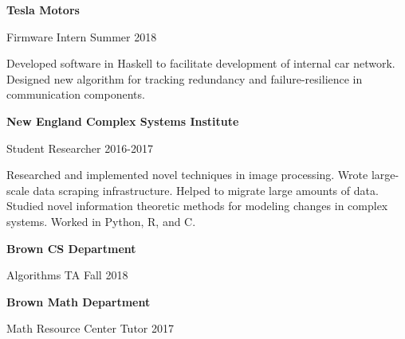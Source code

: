 \documentclass{article}
\renewcommand{\section}[1]{\vspace{1.5em}{\huge \textsc{#1}}\vspace{1em}}
\renewcommand{\subsection}[1]{{\large \textbf{#1}}\vspace{0.5em}}
\newcommand{\descdate}[2]{#1 \hfill #2\vspace{0.5em}}
\newenvironment{row}{\vspace{0.75em}\begin{minipage}[t]{\textwidth}}{\end{minipage}\vspace{0.75em}}
\newenvironment{column2}{%
  \begin{minipage}[t]{0.5\textwidth}%
    \begin{minipage}[t]{0.9\textwidth}}{%
    \end{minipage}%
  \end{minipage}}
\begin{document}
\begin{row}
  \begin{column2}
    \subsection{Tesla Motors}

    \descdate{Firmware Intern}{Summer 2018}

    Developed software in Haskell to facilitate development of internal car network. Designed new algorithm for tracking redundancy and failure-resilience in communication components.
  \end{column2}
  \begin{column2}
    \subsection{New England Complex Systems Institute}

    \descdate{Student Researcher}{2016-2017}

    Researched and implemented novel techniques in image processing. Wrote large-scale data scraping infrastructure. Helped to migrate large amounts of data. Studied novel information theoretic methods for modeling changes in complex systems. Worked in Python, R, and C.%
  \end{column2}
\end{row}

\begin{row}
  \begin{column2}
    \subsection{Brown CS Department}

    \descdate{Algorithms TA}{Fall 2018}
  \end{column2}
  \begin{column2}
    \subsection{Brown Math Department}

    \descdate{Math Resource Center Tutor}{2017}
  \end{column2}
\end{row}

\section{Projects}
\end{document}
